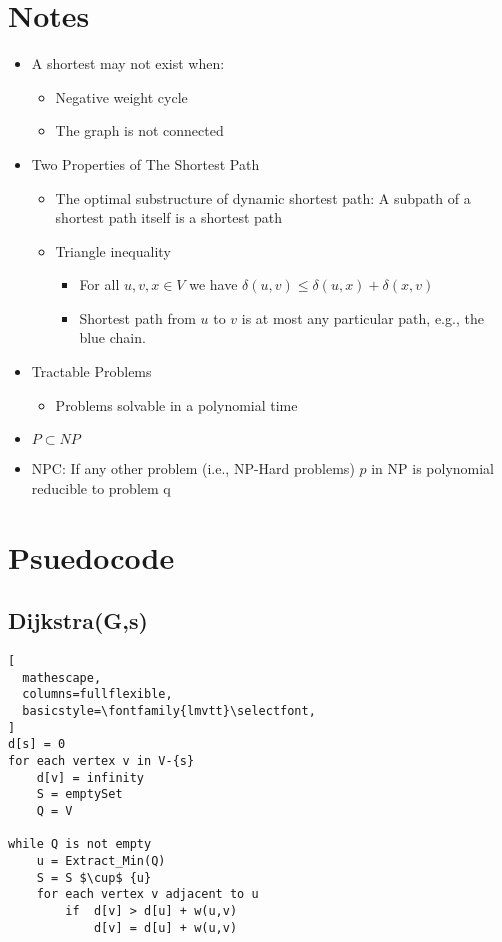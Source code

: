 \documentclass{article}
\begin{document}
\section{Notes}
\begin{itemize}
    \item A shortest may not exist when:
    \begin{itemize}
        \item Negative weight cycle
        \item The graph is not connected
    \end{itemize}

    \item Two Properties of The Shortest Path
    \begin{itemize}
    \item The optimal substructure of dynamic shortest path: A subpath of a shortest path itself is a shortest path

    \item Triangle inequality
    \begin{itemize}
        \item For all $u, v, x \in V$ we have $\delta (u, v) \leq \delta (u, x) + \delta (x, v) $
        \item Shortest path from $u$ to $v$ is at most any particular path, e.g., the blue chain.
    \end{itemize}
    \end{itemize}

    \item Tractable Problems
    \begin{itemize}
        \item Problems solvable in a polynomial time
    \end{itemize}
    \item $P \subset NP$
    \item NPC: If any other problem (i.e., NP-Hard problems) $p$ in NP is polynomial reducible to problem q
\end{itemize}

\section{Psuedocode}
\subsection{Dijkstra(G,s)}
\begin{lstlisting}[
  mathescape,
  columns=fullflexible,
  basicstyle=\fontfamily{lmvtt}\selectfont,
]
d[s] = 0
for each vertex v in V-{s}
    d[v] = infinity
    S = emptySet
    Q = V

while Q is not empty
    u = Extract_Min(Q)
    S = S $\cup$ {u}
    for each vertex v adjacent to u
        if  d[v] > d[u] + w(u,v)
            d[v] = d[u] + w(u,v)
\end{lstlisting}
\end{document}
